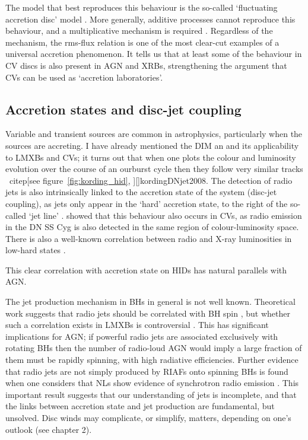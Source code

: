 The model that best reproduces this behaviour is the so-called
`fluctuating accretion disc' model \citep{lyubarskii1997,kotov2001,
arevalo2006,hogg2015}. More generally,
additive processes cannot reproduce this behaviour, and a multiplicative
mechanism is required \citep{uttley2005}. 
Regardless of the mechanism, the rms-flux relation is one of the most
clear-cut examples of a universal accretion phenomenon. 
It tells us that at least some of the behaviour in CV discs
is also present in AGN and XRBs, strengthening the argument that CVs
can be used as `accretion laboratories'. 


\subsection{Accretion states and disc-jet coupling}
\label{sec:disc-jet}

Variable and transient sources are common in astrophysics, particularly
when the sources are accreting. I have already mentioned the DIM an
and its applicability to LMXBs and CVs; it turns out that when one plots
the colour and luminosity evolution over the course of an ourburst cycle 
then they follow very similar tracks \
citep[see figure~\ref{fig:kording_hid}, ][]{kordingDNjet2008}.
The detection of radio jets is also intrinsically linked to the accretion state
of the system (disc-jet coupling), as jets only appear in the `hard' accretion 
state, to the right of the so-called `jet line' \citep{fender2001,fender2004}.
\cite{kordingDNjet2008} showed that this behaviour also occurs in CVs, 
as radio emission in the DN SS Cyg is also detected in the same region 
of colour-luminosity space. There is also a well-known correlation between 
radio and X-ray luminosities in low-hard states \citep{gallo2003}.

This clear correlation with accretion state on HIDs has natural parallels 
with AGN. 


The jet production mechanism in BHs in general is not well known. 
Theoretical work suggests that radio jets should be correlated with BH spin 
\citep{penrose1971,blandford1977}, 
but whether such a correlation exists in LMXBs is 
controversial \citep{fender2010,narayan2012}.
This has significant implications for AGN; if powerful radio jets are 
associated exclusively with rotating BHs then the number of radio-loud AGN
would imply a large fraction of them must be rapidly spinning, with
high radiative efficiencies. 
Further evidence that radio jets are not simply produced by RIAFs onto spinning
BHs is found when one considers that NLs show evidence of synchrotron
radio emission \citep{coppejans2015}. This important result suggests that our understanding
of jets is incomplete, and that the links between accretion state and 
jet production are fundamental, but unsolved. Disc winds may complicate, or simplify,
matters, depending on one's outlook (see chapter 2).

